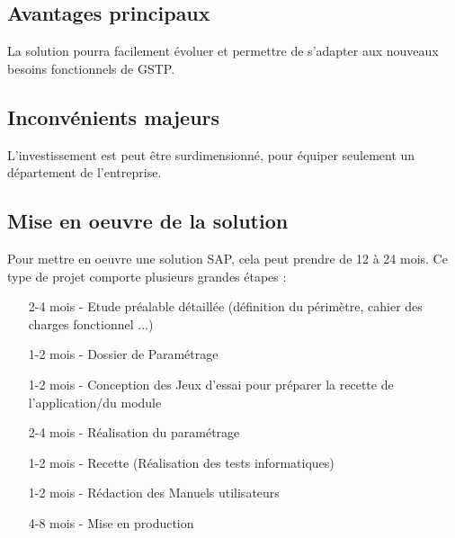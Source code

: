 \subsection{Avantages principaux}

La solution pourra facilement évoluer et permettre de s'adapter aux nouveaux besoins
fonctionnels de GSTP.

\subsection{Inconvénients majeurs}

L'investissement est peut être surdimensionné, pour équiper seulement un département
de l'entreprise.

\subsection{Mise en oeuvre de la solution}
Pour mettre en oeuvre une solution SAP, cela peut prendre de 12 à 24 mois.
Ce type de projet comporte plusieurs grandes étapes :

\begin{itemize}
	\item[2-4 mois -] Etude préalable détaillée (définition du périmètre, cahier des charges fonctionnel ...)
	\item[1-2 mois -] Dossier de Paramétrage
	\item[1-2 mois -] Conception des Jeux d’essai pour préparer la recette de l'application/du module
	\item[2-4 mois -] Réalisation du paramétrage
	\item[1-2 mois -] Recette (Réalisation des tests informatiques)
	\item[1-2 mois -] Rédaction des Manuels utilisateurs
	\item[4-8 mois -] Mise en production
\end{itemize}
